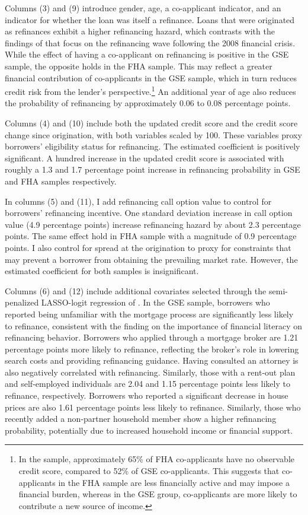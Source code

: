 \documentclass[11pt]{article}
\begin{document}
{Columns (3) and (9) introduce gender, age, a co-applicant indicator, and an indicator for whether the loan was itself a refinance. Loans that were originated as refinances exhibit a higher refinancing hazard, which contrasts with the findings of \citet{gerardi2023mortgage} that focus on the refinancing wave following the 2008 financial crisis. While the effect of having a co-applicant on refinancing is positive in the GSE sample, the opposite holds in the FHA sample. This may reflect a greater financial contribution of co-applicants in the GSE sample, which in turn reduces credit risk from the lender’s perspective.\footnote{In the sample, approximately 65\% of FHA co-applicants have no observable credit score, compared to 52\% of GSE co-applicants. This suggests that co-applicants in the FHA sample are less financially active and may impose a financial burden, whereas in the GSE group, co-applicants are more likely to contribute a new source of income.} An additional year of age also reduces the probability of refinancing by approximately 0.06 to 0.08 percentage points.

Columns (4) and (10) include both the updated credit score and the credit score change since origination, with both variables scaled by 100. These variables proxy borrowers' eligibility status for refinancing.  The estimated coefficient is positively significant. A hundred increase in the updated credit score is associated with roughly a 1.3 and 1.7 percentage point increase in refinancing probability in GSE and FHA samples respectively.  


In columns (5) and (11), I add \citet{deng2000mortgage} refinancing call option value to control for borrowers' refinancing incentive. One standard deviation increase in  call option value (4.9 percentage points) increase refinancing hazard by about 2.3 percentage points. The same effect hold in FHA sample with a magnitude of 0.9 percentage points.  I also control for spread at the origination to proxy for constraints that may prevent a borrower from obtaining the prevailing market rate. However, the estimated coefficient for both samples is insignificant.

Columns (6) and (12) include additional covariates selected through the semi-penalized LASSO-logit regression of \citet{belloni2016post}.  In the GSE sample, borrowers who reported being unfamiliar with the mortgage process are significantly less likely to refinance, consistent with the finding on the importance of financial literacy on refinancing behavior. Borrowers who applied through a mortgage broker are 1.21 percentage points more likely to refinance, reflecting the broker’s role in lowering search costs and providing refinancing guidance. Having consulted an attorney is also negatively correlated with refinancing. Similarly, those with a rent-out plan and self-employed individuals are 2.04 and 1.15 percentage points less likely to refinance, respectively.  Borrowers who reported a significant decrease in house prices are also 1.61 percentage points less likely to refinance. Similarly, those who recently added a non-partner household member show a higher refinancing probability, potentially due to increased household income or financial support.

}
\end{document}
